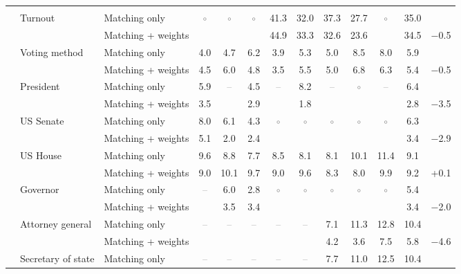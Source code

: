 \begin{table}[!htbp]
{\begin{threeparttable}
\begin{tabular}{llcccccccccc}
\addlinespace[0.3em]
\multicolumn{12}{l}{Non-demographic} \\
\addlinespace[0.1em]
~~Turnout & Matching only & \textcolor{gray}{$\circ$} & \textcolor{gray}{$\circ$} & \textcolor{gray}{$\circ$} & 41.3 & 32.0 & 37.3 & 27.7 & \textcolor{gray}{$\circ$} & 35.0 & \\
 & Matching + weights &  &  &  & 44.9 & 33.3 & 32.6 & 23.6 &  & 34.5 & $-$0.5 \\
\addlinespace[0.1em]
~~Voting method & Matching only & 4.0 & 4.7 & 6.2 & 3.9 & 5.3 & 5.0 & 8.5 & 8.0 & 5.9 & \\
 & Matching + weights & 4.5 & 6.0 & 4.8 & 3.5 & 5.5 & 5.0 & 6.8 & 6.3 & 5.4 & $-$0.5 \\
\addlinespace[0.1em]
~~President & Matching only & 5.9 & \textcolor{gray}{--} & 4.5 & \textcolor{gray}{--} & 8.2 & \textcolor{gray}{--} & \textcolor{gray}{$\circ$} & \textcolor{gray}{--} & 6.4 & \\
 & Matching + weights & 3.5 &  & 2.9 &  & 1.8 &  &  &  & 2.8 & $-$3.5 \\
\addlinespace[0.1em]
~~US Senate & Matching only & 8.0 & 6.1 & 4.3 & \textcolor{gray}{$\circ$} & \textcolor{gray}{$\circ$} & \textcolor{gray}{$\circ$} & \textcolor{gray}{$\circ$} & \textcolor{gray}{$\circ$} & 6.3 & \\
 & Matching + weights & 5.1 & 2.0 & 2.4 &  &  &  &  &  & 3.4 & $-$2.9 \\
\addlinespace[0.1em]
~~US House & Matching only & 9.6 & 8.8 & 7.7 & 8.5 & 8.1 & 8.1 & 10.1 & 11.4 & 9.1 & \\
 & Matching + weights & 9.0 & 10.1 & 9.7 & 9.0 & 9.6 & 8.3 & 8.0 & 9.9 & 9.2 & +0.1 \\
\addlinespace[0.1em]
~~Governor & Matching only & \textcolor{gray}{--} & 6.0 & 2.8 & \textcolor{gray}{$\circ$} & \textcolor{gray}{$\circ$} & \textcolor{gray}{$\circ$} & \textcolor{gray}{$\circ$} & \textcolor{gray}{$\circ$} & 5.4 & \\
 & Matching + weights &  & 3.5 & 3.4 &  &  &  &  &  & 3.4 & $-$2.0 \\
\addlinespace[0.1em]
~~Attorney general & Matching only & \textcolor{gray}{--} & \textcolor{gray}{--} & \textcolor{gray}{--} & \textcolor{gray}{--} & \textcolor{gray}{--} & 7.1 & 11.3 & 12.8 & 10.4 & \\
 & Matching + weights &  &  &  &  &  & 4.2 & 3.6 & 7.5 & 5.8 & $-$4.6 \\
\addlinespace[0.1em]
~~Secretary of state & Matching only & \textcolor{gray}{--} & \textcolor{gray}{--} & \textcolor{gray}{--} & \textcolor{gray}{--} & \textcolor{gray}{--} & 7.7 & 11.0 & 12.5 & 10.4 & \\

\end{tabular}
\end{threeparttable}}
\end{table}
